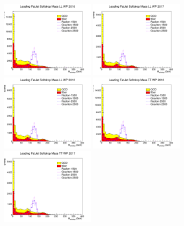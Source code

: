 \begin{figure}[!htb]
	\centering
	\includegraphics[width=0.4\textwidth]{Figures/msd0LL_16_deepTagMD_HbbvsQCD.png}
	\includegraphics[width=0.4\textwidth]{Figures/msd0LL_17_deepTagMD_HbbvsQCD.png}
	\includegraphics[width=0.4\textwidth]{Figures/msd0LL_18_deepTagMD_HbbvsQCD.png}
	\includegraphics[width=0.4\textwidth]{Figures/msd0TT_16_deepTagMD_HbbvsQCD.png}
	\includegraphics[width=0.4\textwidth]{Figures/msd0TT_17_deepTagMD_HbbvsQCD.png}

\end{figure}
